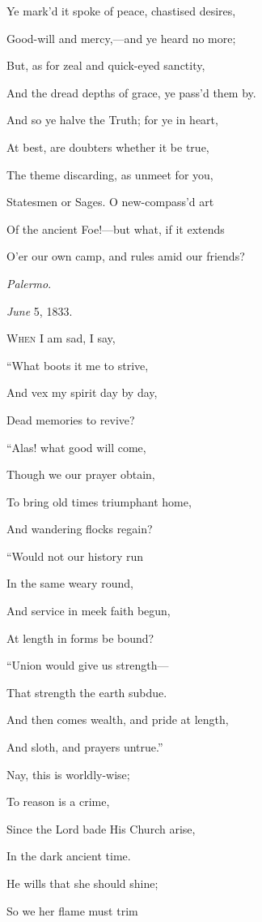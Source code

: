 Ye mark'd it spoke of peace, chastised desires,

Good-will and mercy,—and ye heard no more;

But, as for zeal and quick-eyed sanctity,

And the dread depths of grace, ye pass'd them by.

And so ye halve the Truth; for ye in heart,

At best, are doubters whether it be true,

The theme discarding, as unmeet for you,

Statesmen or Sages. O new-compass'd art

Of the ancient Foe!—but what, if it extends

O'er our own camp, and rules amid our friends?

\emph{Palermo}.

\emph{June} 5, 1833.


W\textsc{hen} I am sad, I say,

``What boots it me to strive,

And vex my spirit day by day,

Dead memories to revive?

``Alas! what good will come,

Though we our prayer obtain,

To bring old times triumphant home,

And wandering flocks regain?

``Would not our history run

In the same weary round,

And service in meek faith begun,

At length in forms be bound?

``Union would give us strength—

That strength the earth subdue.

And then comes wealth, and pride at length,

And sloth, and prayers untrue.'' 

Nay, this is worldly-wise;

To reason is a crime,

Since the Lord bade His Church arise,

In the dark ancient time.

He wills that she should shine;

So we her flame must trim

